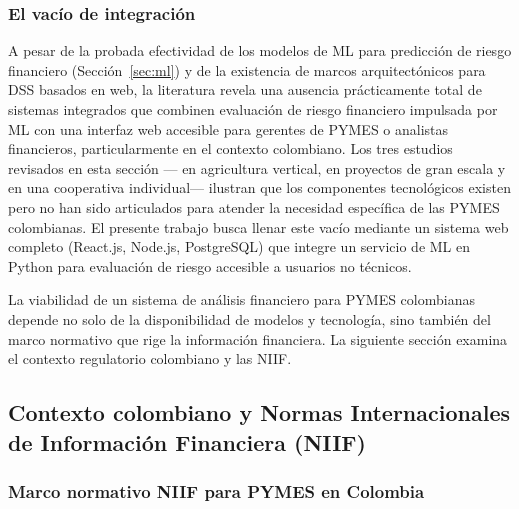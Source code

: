 \documentclass[12pt, letterpaper]{article}
\begin{document}
\subsubsection{El vac\'io de integraci\'on}

A pesar de la probada efectividad de los modelos de ML para predicci\'on de riesgo financiero (Secci\'on~\ref{sec:ml}) y de la existencia de marcos arquitect\'onicos para DSS basados en web, la literatura revela una ausencia pr\'acticamente total de sistemas integrados que combinen evaluaci\'on de riesgo financiero impulsada por ML con una interfaz web accesible para gerentes de PYMES o analistas financieros, particularmente en el contexto colombiano. Los tres estudios revisados en esta secci\'on ---\citet{BaumontDeOliveira2021} en agricultura vertical, \citet{Sholapurapu2024} en proyectos de gran escala y \citet{MayorgaLira2023} en una cooperativa individual--- ilustran que los componentes tecnol\'ogicos existen pero no han sido articulados para atender la necesidad espec\'ifica de las PYMES colombianas. El presente trabajo busca llenar este vac\'io mediante un sistema web completo (React.js, Node.js, PostgreSQL) que integre un servicio de ML en Python para evaluaci\'on de riesgo accesible a usuarios no t\'ecnicos.

La viabilidad de un sistema de an\'alisis financiero para PYMES colombianas depende no solo de la disponibilidad de modelos y tecnolog\'ia, sino tambi\'en del marco normativo que rige la informaci\'on financiera. La siguiente secci\'on examina el contexto regulatorio colombiano y las NIIF.

\subsection{Contexto colombiano y Normas Internacionales de Informaci\'on Financiera (NIIF)}
\label{sec:niif}

\subsubsection{Marco normativo NIIF para PYMES en Colombia}
\end{document}
